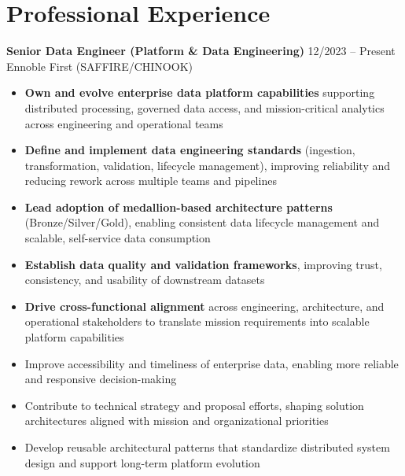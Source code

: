 \section*{Professional Experience}

\textbf{Senior Data Engineer (Platform \& Data Engineering)} \hfill 12/2023 – Present \\
Ennoble First (SAFFIRE/CHINOOK)
\begin{itemize}
    \item \textbf{Own and evolve enterprise data platform capabilities} supporting distributed processing, governed data access, and mission-critical analytics across engineering and operational teams
    \item \textbf{Define and implement data engineering standards} (ingestion, transformation, validation, lifecycle management), improving reliability and reducing rework across multiple teams and pipelines
    \item \textbf{Lead adoption of medallion-based architecture patterns} (Bronze/Silver/Gold), enabling consistent data lifecycle management and scalable, self-service data consumption
    \item \textbf{Establish data quality and validation frameworks}, improving trust, consistency, and usability of downstream datasets
    \item \textbf{Drive cross-functional alignment} across engineering, architecture, and operational stakeholders to translate mission requirements into scalable platform capabilities
    \item Improve accessibility and timeliness of enterprise data, enabling more reliable and responsive decision-making
    \item Contribute to technical strategy and proposal efforts, shaping solution architectures aligned with mission and organizational priorities
    \item Develop reusable architectural patterns that standardize distributed system design and support long-term platform evolution
\end{itemize}
\vspace{0.3em}

